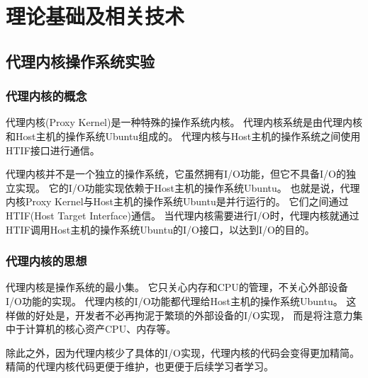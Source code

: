 %
%
%
%
%
%

\chapter{理论基础及相关技术}

\section{代理内核操作系统实验}

\subsection{代理内核的概念}

代理内核(Proxy Kernel)是一种特殊的操作系统内核。
代理内核系统是由代理内核和Host主机的操作系统Ubuntu组成的。
代理内核与Host主机的操作系统之间使用HTIF接口进行通信。

代理内核并不是一个独立的操作系统，它虽然拥有I/O功能，但它不具备I/O的独立实现。
它的I/O功能实现依赖于Host主机的操作系统Ubuntu。
也就是说，代理内核Proxy Kernel与Host主机的操作系统Ubuntu是并行运行的。
它们之间通过HTIF(Host Target Interface)通信。
当代理内核需要进行I/O时，代理内核就通过HTIF调用Host主机的操作系统Ubuntu的I/O接口，以达到I/O的目的。

\subsection{代理内核的思想}

代理内核是操作系统的最小集。
它只关心内存和CPU的管理，不关心外部设备I/O功能的实现。
代理内核的I/O功能都代理给Host主机的操作系统Ubuntu。
这样做的好处是，开发者不必再拘泥于繁琐的外部设备的I/O实现，
而是将注意力集中于计算机的核心资产CPU、内存等。

除此之外，因为代理内核少了具体的I/O实现，代理内核的代码会变得更加精简。
精简的代理内核代码更便于维护，也更便于后续学习者学习。

